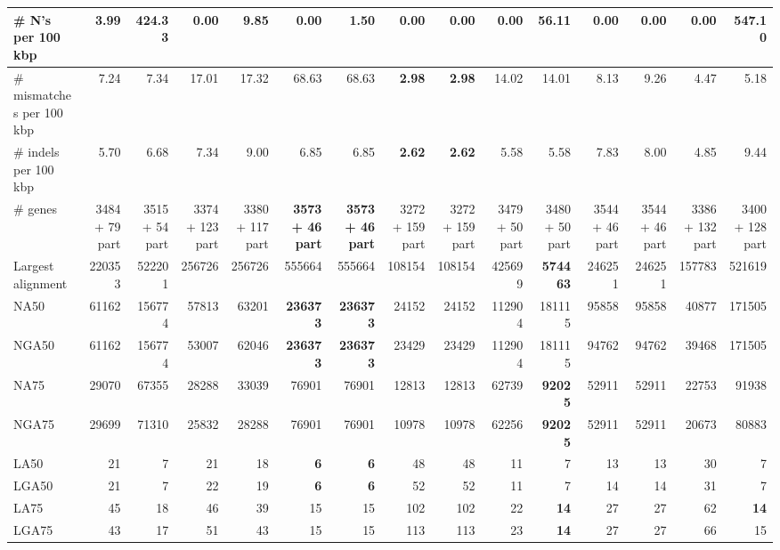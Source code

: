 \documentclass[12pt,a4paper]{article}
\begin{document}
\begin{table}[ht]
\begin{center}
\begin{tabular}{|l*{14}{|r}|}
\# N's per 100 kbp & 3.99 & 424.33 & {\bf 0.00} & 9.85 & {\bf 0.00} & 1.50 & {\bf 0.00} & {\bf 0.00} & {\bf 0.00} & 56.11 & {\bf 0.00} & {\bf 0.00} & {\bf 0.00} & 547.10 \\ \hline
\# mismatches per 100 kbp & 7.24 & 7.34 & 17.01 & 17.32 & 68.63 & 68.63 & {\bf 2.98} & {\bf 2.98} & 14.02 & 14.01 & 8.13 & 9.26 & 4.47 & 5.18 \\ \hline
\# indels per 100 kbp & 5.70 & 6.68 & 7.34 & 9.00 & 6.85 & 6.85 & {\bf 2.62} & {\bf 2.62} & 5.58 & 5.58 & 7.83 & 8.00 & 4.85 & 9.44 \\ \hline
\# genes & 3484 + 79 part & 3515 + 54 part & 3374 + 123 part & 3380 + 117 part & {\bf 3573 + 46 part} & {\bf 3573 + 46 part} & 3272 + 159 part & 3272 + 159 part & 3479 + 50 part & 3480 + 50 part & 3544 + 46 part & 3544 + 46 part & 3386 + 132 part & 3400 + 128 part \\ \hline
Largest alignment & 220353 & 522201 & 256726 & 256726 & 555664 & 555664 & 108154 & 108154 & 425699 & {\bf 574463} & 246251 & 246251 & 157783 & 521619 \\ \hline
NA50 & 61162 & 156774 & 57813 & 63201 & {\bf 236373} & {\bf 236373} & 24152 & 24152 & 112904 & 181115 & 95858 & 95858 & 40877 & 171505 \\ \hline
NGA50 & 61162 & 156774 & 53007 & 62046 & {\bf 236373} & {\bf 236373} & 23429 & 23429 & 112904 & 181115 & 94762 & 94762 & 39468 & 171505 \\ \hline
NA75 & 29070 & 67355 & 28288 & 33039 & 76901 & 76901 & 12813 & 12813 & 62739 & {\bf 92025} & 52911 & 52911 & 22753 & 91938 \\ \hline
NGA75 & 29699 & 71310 & 25832 & 28288 & 76901 & 76901 & 10978 & 10978 & 62256 & {\bf 92025} & 52911 & 52911 & 20673 & 80883 \\ \hline
LA50 & 21 & 7 & 21 & 18 & {\bf 6} & {\bf 6} & 48 & 48 & 11 & 7 & 13 & 13 & 30 & 7 \\ \hline
LGA50 & 21 & 7 & 22 & 19 & {\bf 6} & {\bf 6} & 52 & 52 & 11 & 7 & 14 & 14 & 31 & 7 \\ \hline
LA75 & 45 & 18 & 46 & 39 & 15 & 15 & 102 & 102 & 22 & {\bf 14} & 27 & 27 & 62 & {\bf 14} \\ \hline
LGA75 & 43 & 17 & 51 & 43 & 15 & 15 & 113 & 113 & 23 & {\bf 14} & 27 & 27 & 66 & 15 \\ \hline
\end{tabular}
\end{center}
\end{table}
\end{document}
